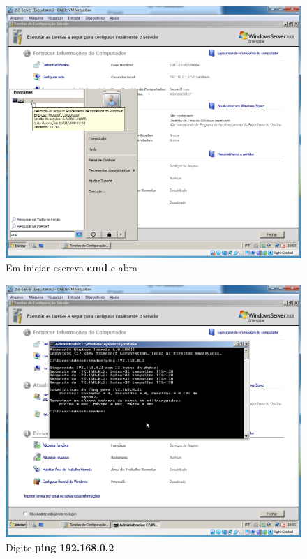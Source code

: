 \documentclass[10pt]{article}
\begin{document}
\begin{figure}[H]
    \centering
    \caption{Em iniciar escreva \textbf{cmd} e abra}
    \label{fig:443006}
    \includegraphics[width=\linewidth]{images/xp_rede/testando_comunicação_entre_os_windows/006.png}
\end{figure}
\begin{figure}[H]
    \centering
    \caption{Digite \textbf{ping 192.168.0.2}}
    \label{fig:443008}
    \includegraphics[width=\linewidth]{images/xp_rede/testando_comunicação_entre_os_windows/008.png}
\end{figure}
\end{document}
